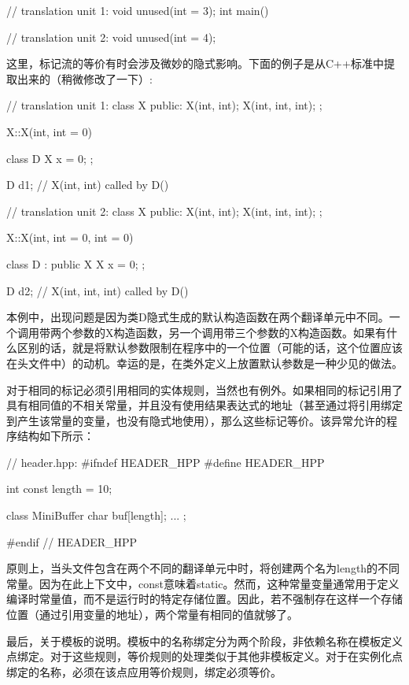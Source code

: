 \begin{cpp}
// translation unit 1:
void unused(int = 3);
int main()
{ }

// translation unit 2:
void unused(int = 4);
\end{cpp}

这里，标记流的等价有时会涉及微妙的隐式影响。下面的例子是从C++标准中提取出来的（稍微修改了一下）:

\begin{cpp}
// translation unit 1:
class X {
	public:
	X(int, int);
	X(int, int, int);
};

X::X(int, int = 0)
{ }

class D {
	X x = 0;
};

D d1; // X(int, int) called by D()

// translation unit 2:
class X {
	public:
	X(int, int);
	X(int, int, int);
};

X::X(int, int = 0, int = 0)
{ }

class D : public X {
	X x = 0;
};

D d2; // X(int, int, int) called by D()
\end{cpp}

本例中，出现问题是因为类D隐式生成的默认构造函数在两个翻译单元中不同。一个调用带两个参数的X构造函数，另一个调用带三个参数的X构造函数。如果有什么区别的话，就是将默认参数限制在程序中的一个位置（可能的话，这个位置应该在头文件中）的动机。幸运的是，在类外定义上放置默认参数是一种少见的做法。

对于相同的标记必须引用相同的实体规则，当然也有例外。如果相同的标记引用了具有相同值的不相关常量，并且没有使用结果表达式的地址（甚至通过将引用绑定到产生该常量的变量，也没有隐式地使用），那么这些标记等价。该异常允许的程序结构如下所示：

\begin{cpp}
// header.hpp:
#ifndef HEADER_HPP
#define HEADER_HPP

int const length = 10;

class MiniBuffer {
	char buf[length];
	...
};

#endif // HEADER_HPP
\end{cpp}

原则上，当头文件包含在两个不同的翻译单元中时，将创建两个名为length的不同常量。因为在此上下文中，const意味着static。然而，这种常量变量通常用于定义编译时常量值，而不是运行时的特定存储位置。因此，若不强制存在这样一个存储位置（通过引用变量的地址），两个常量有相同的值就够了。

最后，关于模板的说明。模板中的名称绑定分为两个阶段，非依赖名称在模板定义点绑定。对于这些规则，等价规则的处理类似于其他非模板定义。对于在实例化点绑定的名称，必须在该点应用等价规则，绑定必须等价。





